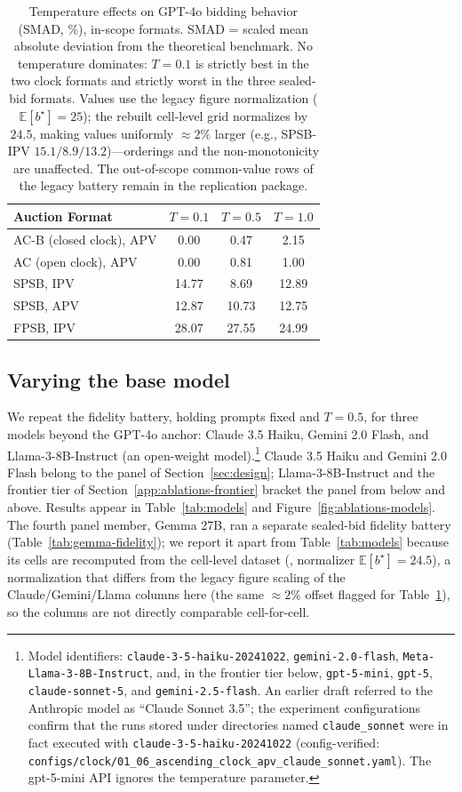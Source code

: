 \begin{table}[htbp]
\centering
\begin{tabular}{l|ccc}
\hline
Auction Format & $T=0.1$ & $T=0.5$ & $T=1.0$ \\
\hline
AC-B (closed clock), APV & 0.00 & 0.47 & 2.15 \\
AC (open clock), APV & 0.00 & 0.81 & 1.00 \\
SPSB, IPV & 14.77 & 8.69 & 12.89 \\
SPSB, APV & 12.87 & 10.73 & 12.75 \\
FPSB, IPV & 28.07 & 27.55 & 24.99 \\
\hline
\end{tabular}
\caption{Temperature effects on GPT-4o bidding behavior (SMAD, \%), in-scope formats. SMAD = scaled mean absolute deviation from the theoretical benchmark. No temperature dominates: $T=0.1$ is strictly best in the two clock formats and strictly worst in the three sealed-bid formats. Values use the legacy figure normalization ($\mathbb{E}[b^\star]=25$); the rebuilt cell-level grid normalizes by $24.5$, making values uniformly $\approx 2\%$ larger (e.g., SPSB-IPV $15.1/8.9/13.2$)---orderings and the non-monotonicity are unaffected. The out-of-scope common-value rows of the legacy battery remain in the replication package.}
\label{tab:temperature}
\end{table}

\subsection{Varying the base model}

We repeat the fidelity battery, holding prompts fixed and $T=0.5$, for three models beyond the GPT-4o anchor: Claude 3.5 Haiku, Gemini 2.0 Flash, and Llama-3-8B-Instruct (an open-weight model).\footnote{Model identifiers: \texttt{claude-3-5-haiku-20241022}, \texttt{gemini-2.0-flash}, \texttt{Meta-Llama-3-8B-Instruct}, and, in the frontier tier below, \texttt{gpt-5-mini}, \texttt{gpt-5}, \texttt{claude-sonnet-5}, and \texttt{gemini-2.5-flash}. An earlier draft referred to the Anthropic model as ``Claude Sonnet 3.5''; the experiment configurations confirm that the runs stored under directories named \texttt{claude\_sonnet} were in fact executed with \texttt{claude-3-5-haiku-20241022} (config-verified: \texttt{configs/clock/01\_06\_ascending\_clock\_apv\_claude\_sonnet.yaml}). The gpt-5-mini API ignores the temperature parameter.} Claude 3.5 Haiku and Gemini 2.0 Flash belong to the panel of Section~\ref{sec:design}; Llama-3-8B-Instruct and the frontier tier of Section~\ref{app:ablations-frontier} bracket the panel from below and above. Results appear in Table~\ref{tab:models} and Figure~\ref{fig:ablations-models}. The fourth panel member, Gemma 27B, ran a separate sealed-bid fidelity battery (Table~\ref{tab:gemma-fidelity}); we report it apart from Table~\ref{tab:models} because its cells are recomputed from the cell-level dataset (, normalizer $\mathbb{E}[b^\star]=24.5$), a normalization that differs from the legacy figure scaling of the Claude/Gemini/Llama columns here (the same $\approx\!2\%$ offset flagged for Table~\ref{tab:temperature}), so the columns are not directly comparable cell-for-cell.

